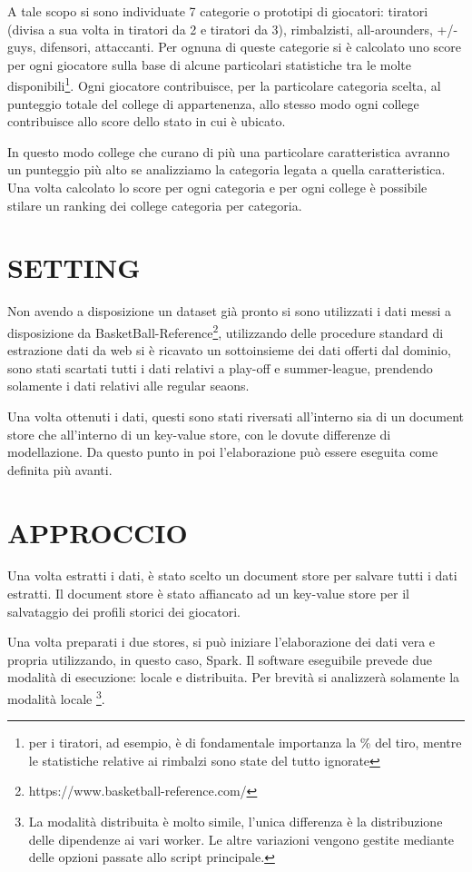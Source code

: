 \documentclass[10.5pt,a4paper,twocolumn]{article}
\begin{document}
A tale scopo si sono individuate 7 categorie o prototipi di giocatori: tiratori (divisa a sua volta in tiratori da 2 e tiratori da 3), rimbalzisti, all-arounders, +/- guys, difensori, attaccanti. Per ognuna di queste categorie si è calcolato uno score per ogni giocatore sulla base di alcune particolari statistiche tra le molte disponibili\footnote{per i tiratori, ad esempio, è di fondamentale importanza la \% del tiro, mentre le statistiche relative ai rimbalzi sono state del tutto ignorate}. Ogni giocatore contribuisce, per la particolare categoria scelta, al punteggio totale del college di appartenenza, allo stesso modo ogni college contribuisce allo score dello stato in cui è ubicato.

In questo modo college che curano di più una particolare caratteristica avranno un punteggio più alto se analizziamo la categoria legata a quella caratteristica. Una volta calcolato lo score per ogni categoria e per ogni college è possibile stilare un ranking dei college categoria per categoria.


\section{SETTING}

Non avendo a disposizione un dataset già pronto si sono utilizzati i dati messi a disposizione da BasketBall-Reference\footnote{https://www.basketball-reference.com/}, utilizzando delle procedure standard di estrazione dati da web si è ricavato un sottoinsieme dei dati offerti dal dominio, sono stati scartati tutti i dati relativi a play-off e  summer-league, prendendo solamente i dati relativi alle regular seaons. 

Una volta ottenuti i dati, questi sono stati riversati all'interno sia di un document store che all'interno di un key-value store, con le dovute differenze di modellazione. Da questo punto in poi l'elaborazione può essere eseguita come definita più avanti.

\section{APPROCCIO}

Una volta estratti i dati, è stato scelto un document store per salvare tutti i dati estratti. Il document store è stato affiancato ad un key-value store per il salvataggio dei profili storici dei giocatori.

Una volta preparati i due stores, si può iniziare l'elaborazione dei dati vera e propria utilizzando, in questo caso, Spark. Il software eseguibile prevede due modalità di esecuzione: locale e distribuita. Per brevità si analizzerà solamente la modalità locale \footnote{La modalità distribuita è molto simile, l'unica differenza è la distribuzione delle dipendenze ai vari worker. Le altre variazioni vengono gestite mediante delle opzioni passate allo script principale.}.
\end{document}
